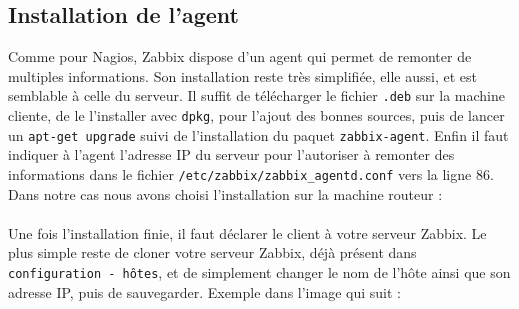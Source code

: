 	\subsection{\label{installAgent}Installation de l'agent}
		\vspace{0.3cm}

		Comme pour Nagios, Zabbix dispose d'un agent qui permet de remonter de multiples informations. Son installation reste très simplifiée, elle aussi, et est semblable à celle du serveur. Il suffit de télécharger le fichier \verb?.deb? sur la machine cliente, de le l'installer avec \verb?dpkg?, pour l'ajout des bonnes sources, puis de lancer un \verb?apt-get upgrade? suivi de l'installation du paquet \verb?zabbix-agent?. Enfin il faut indiquer à l'agent l'adresse IP du serveur pour l'autoriser à remonter des informations dans le fichier \verb?/etc/zabbix/zabbix_agentd.conf? vers la ligne 86. Dans notre cas nous avons choisi l'installation sur la machine routeur : \\

			\\

			Une fois l'installation finie, il faut déclarer le client à votre serveur Zabbix. Le plus simple reste de cloner votre serveur Zabbix, déjà présent dans \verb?configuration - hôtes?, et de simplement changer le nom de l'hôte ainsi que son adresse IP, puis de sauvegarder. Exemple dans l'image qui suit : \\

